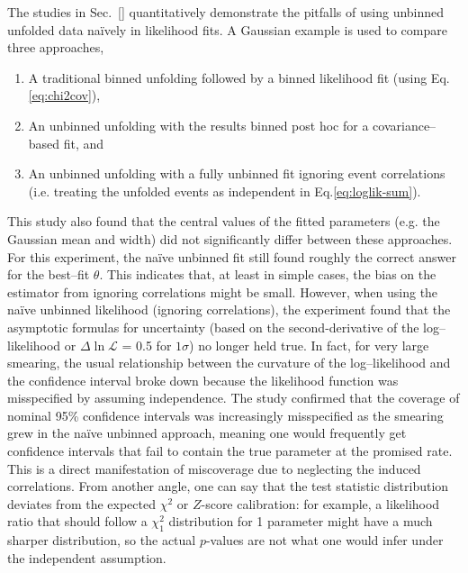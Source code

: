    The studies in Sec.~\ref{} quantitatively demonstrate the pitfalls of using unbinned unfolded data naïvely in likelihood fits.
    A Gaussian example is used to compare three approaches,
    \begin{enumerate}
        \item A traditional binned unfolding followed by a binned likelihood fit (using Eq.\ref{eq:chi2cov}),
        \item An unbinned unfolding with the results binned post hoc for a covariance--based fit, and
        \item An unbinned unfolding with a fully unbinned fit ignoring event correlations (i.e. treating the unfolded events as independent in Eq.\ref{eq:loglik-sum}).
    \end{enumerate}
    This study also found that the central values of the fitted parameters (e.g. the Gaussian mean and width) did not significantly differ between these approaches.
    For this experiment, the naïve unbinned fit still found roughly the correct answer for the best--fit $\theta$.
    This indicates that, at least in simple cases, the bias on the estimator from ignoring correlations might be small.
    However, when using the naïve unbinned likelihood (ignoring correlations), the experiment found that the asymptotic formulas for uncertainty (based on the second-derivative of the log--likelihood or $\Delta \ln\mathcal{L}$ = 0.5 for $1\sigma$) no longer held true.
    In fact, for very large smearing, the usual relationship between the curvature of the log--likelihood and the confidence interval broke down because the likelihood function was misspecified by assuming independence.
    The study confirmed that the coverage of nominal 95\% confidence intervals was increasingly misspecified as the smearing grew in the naïve unbinned approach, meaning one would frequently get confidence intervals that fail to contain the true parameter at the promised rate.
    This is a direct manifestation of miscoverage due to neglecting the induced correlations.
    From another angle, one can say that the test statistic distribution deviates from the expected $\chi^2$ or $Z$-score calibration: for example, a likelihood ratio that should follow a $\chi^2_1$ distribution for 1 parameter might have a much sharper distribution, so the actual $p$-values are not what one would infer under the independent assumption.

